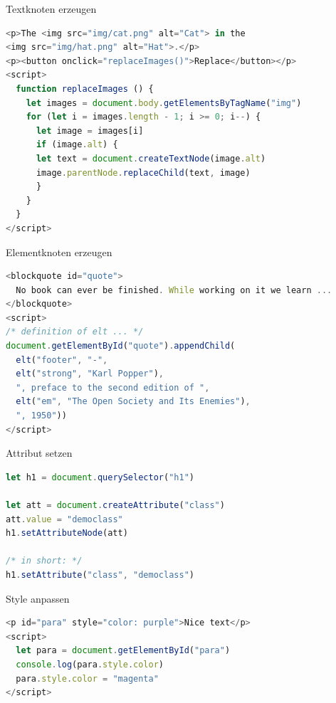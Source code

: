 \begin{examplecode}{Textknoten erzeugen}
\begin{lstlisting}[language=JavaScript, style=basesmol]
<p>The <img src="img/cat.png" alt="Cat"> in the
<img src="img/hat.png" alt="Hat">.</p>
<p><button onclick="replaceImages()">Replace</button></p>
<script>
  function replaceImages () {
    let images = document.body.getElementsByTagName("img")
    for (let i = images.length - 1; i >= 0; i--) {
      let image = images[i]
      if (image.alt) {
      let text = document.createTextNode(image.alt)
      image.parentNode.replaceChild(text, image)
      }
    }
  }
</script>
\end{lstlisting}
\end{examplecode}


  
\begin{examplecode}{Elementknoten erzeugen}
\begin{lstlisting}[language=JavaScript, style=basesmol]
<blockquote id="quote">
  No book can ever be finished. While working on it we learn ...
</blockquote>
<script>
/* definition of elt ... */
document.getElementById("quote").appendChild(
  elt("footer", "-",
  elt("strong", "Karl Popper"),
  ", preface to the second edition of ",
  elt("em", "The Open Society and Its Enemies"),
  ", 1950"))
</script>
\end{lstlisting}
\end{examplecode}
  
\begin{examplecode}{Attribut setzen}
\begin{lstlisting}[language=JavaScript, style=basesmol]
let h1 = document.querySelector("h1")

let att = document.createAttribute("class")
att.value = "democlass"
h1.setAttributeNode(att)

/* in short: */
h1.setAttribute("class", "democlass")
\end{lstlisting}
\end{examplecode}

\begin{examplecode}{Style anpassen}
\begin{lstlisting}[language=JavaScript, style=basesmol]
<p id="para" style="color: purple">Nice text</p>
<script>
  let para = document.getElementById("para")
  console.log(para.style.color)
  para.style.color = "magenta"
</script>
\end{lstlisting}
\end{examplecode}
  
